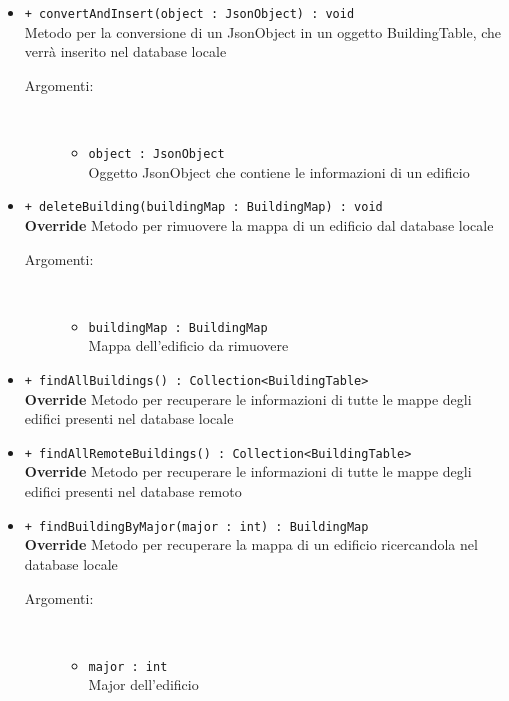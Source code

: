 \documentclass[../DefinizioneDiProdotto.tex]{subfiles}
\begin{document}
\begin{description}
\begin{itemize}
\begin{description}
		\end{description}
		\item \texttt{+ convertAndInsert(object : JsonObject) : void}\\
		Metodo per la conversione di un JsonObject in un oggetto BuildingTable, che verrà inserito nel database locale
		\begin{description}
			\item[Argomenti:] \
			\begin{itemize}
				\item \texttt{object : JsonObject}\\
				Oggetto JsonObject che contiene le informazioni di un edificio\end{itemize}
		\end{description}
		\item \texttt{+ deleteBuilding(buildingMap : BuildingMap) : void}\\
		\textbf{Override} Metodo per rimuovere la mappa di un edificio dal database locale
		\begin{description}
			\item[Argomenti:] \
			\begin{itemize}
				\item \texttt{buildingMap : BuildingMap}\\
				Mappa dell'edificio da rimuovere\end{itemize}
		\end{description}
		\item \texttt{+ findAllBuildings() : Collection<BuildingTable>}\\
		\textbf{Override} Metodo per recuperare le informazioni di tutte le mappe degli edifici presenti nel database locale
		\item \texttt{+ findAllRemoteBuildings() : Collection<BuildingTable>}\\
		\textbf{Override} Metodo per recuperare le informazioni di tutte le mappe degli edifici presenti nel database remoto
		\item \texttt{+ findBuildingByMajor(major : int) : BuildingMap}\\
		\textbf{Override} Metodo per recuperare la mappa di un edificio ricercandola nel database locale
		\begin{description}
			\item[Argomenti:] \
			\begin{itemize}
				\item \texttt{major : int}\\
				Major dell'edificio\end{itemize}

\end{description}
\end{itemize}
\end{description}
\end{document}
